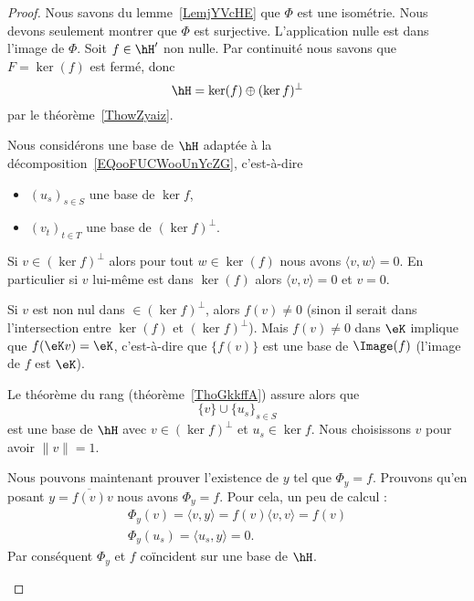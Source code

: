 \begin{proof}
	Nous savons du lemme~\ref{LemjYVcHE} que \(\Phi\) est une isométrie. Nous devons seulement montrer que \( \Phi\) est surjective. L'application nulle est dans l'image de \( \Phi\). Soit \( f\in \hH'\) non nulle. Par continuité nous savons que \( F=\ker(f)\) est fermé, donc
	\begin{equation}    \label{EQooFUCWooUnYcZG}
		\hH=\ker(f)\oplus(\ker f)^{\perp}
	\end{equation}
	par le théorème~\ref{ThowZyaiz}.

	\begin{subproof}

		Nous considérons une base de \( \hH\) adaptée à la décomposition~\ref{EQooFUCWooUnYcZG}, c'est-à-dire
		\begin{itemize}
			\item \( (u_s)_{s\in S}\) une base de \( \ker f\),
			\item
			      \( (v_t)_{t\in T}\) une base de \( (\ker f)^{\perp}\).
		\end{itemize}

		\spitem[\( (\ker f)^{\perp}\cap\ker(f)=\{ 0 \}  \)]

		Si \( v\in (\ker f)^{\perp}\) alors pour tout \( w\in \ker(f)\) nous avons \( \langle v, w\rangle =0\). En particulier si \( v\) lui-même est dans \( \ker(f)\) alors \( \langle v, v\rangle =0\) et \( v=0\).

		Si \( v\) est non nul dans \( \in (\ker f)^{\perp}\), alors \( f(v)\neq 0\) (sinon il serait dans l'intersection entre \( \ker(f)\) et \( (\ker f)^{\perp}\)). Mais \( f(v)\neq 0\) dans \( \eK\) implique que \( f(\eK v)=\eK\), c'est-à-dire que \( \{ f(v) \}\) est une base de \( \Image(f)\) (l'image de \( f\) est \( \eK\)).

		Le théorème du rang (théorème~\ref{ThoGkkffA}) assure alors que
		\begin{equation}
			\{ v \}\cup\{ u_s \}_{s\in S}
		\end{equation}
		est une base de \( \hH\) avec \( v\in(\ker f)^{\perp}\) et \( u_s\in \ker f\). Nous choisissons \( v\) pour avoir \( \| v \|=1\).

		\spitem[Existence]

		Nous pouvons maintenant prouver l'existence de \( y\) tel que \(  \Phi_y= f\). Prouvons qu'en posant \( y=\overline{  f(v) }v\) nous avons \(  \Phi_y= f\). Pour cela, un peu de calcul :
		\begin{subequations}
			\begin{align}
				\Phi_y(v)=\langle v, y\rangle = f(v)\langle v, v\rangle = f(v) \\
				\Phi_y(u_s)=\langle u_s, y\rangle =0.
			\end{align}
		\end{subequations}
		Par conséquent \(  \Phi_y\) et \(  f\) coïncident sur une base de \( \hH\).


\end{subproof}
\end{proof}
